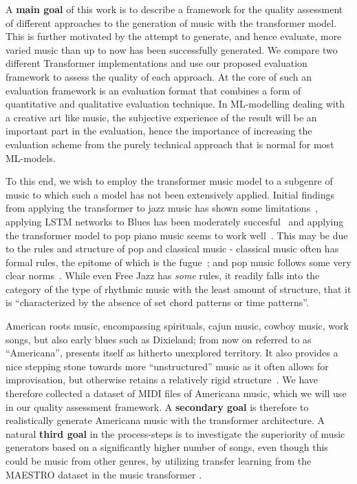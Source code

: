\documentclass{IEEEtran}
\begin{document}
A \textbf{main goal} of this work is to describe a framework for the quality assessment of different
approaches to the generation of music with the transformer model. This is further
motivated by the attempt to generate, and hence evaluate, more varied music than 
up to now has been successfully generated. We compare
two different Transformer implementations and use our proposed evaluation
framework to assess the quality of each approach. At the core of such an evaluation framework
is an evaluation format that combines a form of quantitative and qualitative evaluation technique. 
In ML-modelling dealing with a creative art like music, the subjective 
experience of the result will be an important part in the evaluation, hence the importance of increasing 
the evaluation scheme from the purely technical approach that is normal for most 
ML-models.

To this end, we wish to employ the transformer music model to a subgenre of music
to which such a model has not been extensively applied. Initial findings from
applying the transformer to jazz music has shown some
limitations~\cite{wu2020jazz}, applying LSTM networks to Blues has been
moderately succesful~\cite{eck2002bluesLSTM} and applying the transformer
model to pop piano music seems to work well~\cite{huang2020pop}. This may be due 
to the rules and structure of pop and classical music - classical music often 
has formal rules, the epitome of which is the fugue~\cite{giraud2015computational}; and
pop music follows some very clear norms~\cite{hennion1983production}. While
even Free Jazz has \emph{some} rules, it readily falls into the category of
the type of rhythmic music with the least amount of structure, that it is
``characterized by the absence of set chord patterns or
time patterns''\cite{FreeJazz}.

American roots music, encompassing spirituals, cajun music, cowboy music,
work songs, but also early blues such as Dixieland; from now on referred to
as ``Americana'', presents itself as hitherto unexplored territory. It also
provides a nice stepping stone towards more ``unstructured'' music as it
often allows for improvisation, but otherwise retains a relatively rigid
structure~\cite{libcong}. We have therefore collected a dataset of MIDI files
of Americana music, which we will use in our quality assessment framework.
A \textbf{secondary goal} is therefore to realistically generate Americana music with the 
transformer
architecture. A natural \textbf{third goal} in the process-steps is to investigate the
superiority of music generators based on a significantly higher number of
songs, even though this could be music from other genres, by utilizing
transfer learning from the MAESTRO dataset in the music transformer
\cite{huang2018music}.
\end{document}

